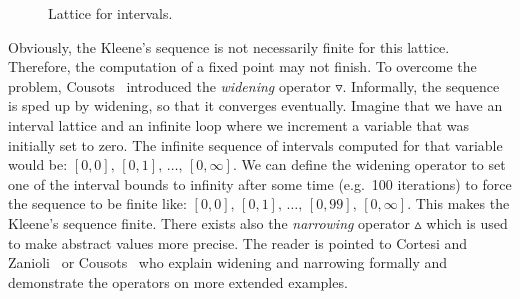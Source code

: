 \begin{figure}[tb]
\begin{center}
\end{center}
\label{fig:state_lat_int}
\caption{Lattice for intervals.}
\end{figure}

Obviously, the Kleene's sequence is not necessarily finite for this lattice.
Therefore, the computation of a fixed point may not finish. To overcome the
problem, Cousots~\cite{cousot} introduced the \emph{widening} operator
$\triangledown$. Informally, the sequence is sped up by widening, so that it
converges eventually.  Imagine that we have an interval lattice and an
infinite loop where we increment a variable that was initially set to zero.
The infinite sequence of intervals computed for that variable would be:
$[0,0],\, [0,1],\, \dots,\, [0,\infty]$. We can define the widening operator
to set one of the interval bounds to infinity after some time (e.g.\ 100
iterations) to force the sequence to be finite like: $[0,0],\, [0,1],\,
\dots,\, [0, 99],\, [0,\infty]$. This makes the Kleene's sequence finite.
There exists also the \emph{narrowing} operator $\vartriangle$ which is used
to make abstract values more precise. The reader is pointed to Cortesi and
Zanioli~\cite{ai_widening} or Cousots~\cite{cousot_galois} who explain
widening and narrowing formally and demonstrate the operators on more extended
examples.

